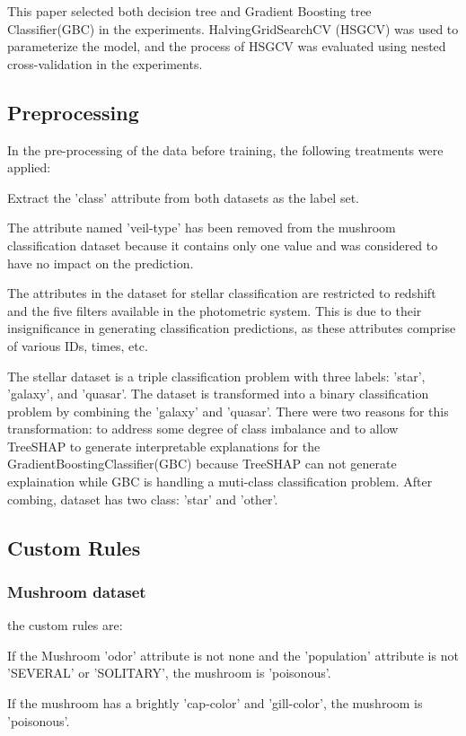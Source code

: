 \documentclass[runningheads,a4paper]{llncs}
\begin{document}
This paper selected both decision tree and Gradient Boosting tree Classifier(GBC) in the experiments. HalvingGridSearchCV (HSGCV)\cite{pmlr-v51-jamieson16} was used to parameterize the model, and the process of HSGCV was evaluated using nested cross-validation\cite{https://doi.org/10.1111/j.2517-6161.1974.tb00994.x} in the experiments.

\subsection{Preprocessing}
In the pre-processing of the data before training, the following treatments were applied:

Extract the 'class' attribute from both datasets as the label set.

The attribute named 'veil-type' has been removed from the mushroom  classification dataset because it contains only one value and was considered to have no impact on the prediction.

The attributes in the dataset for stellar classification are restricted to redshift and the five filters available in the photometric system. This is due to their insignificance in generating classification predictions, as these attributes comprise of various IDs, times, etc.

The stellar dataset is a triple classification problem with three labels: 'star', 'galaxy', and 'quasar'. 
The dataset is transformed into a binary classification problem by combining the 'galaxy' and 'quasar'. 
There were two reasons for this transformation: to address some degree of class imbalance and to allow TreeSHAP to generate interpretable explanations for the GradientBoostingClassifier(GBC) because TreeSHAP can not generate explaination while GBC is  handling a muti-class classification problem.
After combing, dataset has two class: 'star' and 'other'.
\subsection{Custom Rules}
\subsubsection{Mushroom dataset} 

the custom rules are:

If the Mushroom 'odor' attribute is not none and the 'population' attribute is not 'SEVERAL' or 'SOLITARY', the mushroom is 'poisonous'.

If the mushroom has a brightly 'cap-color' and 'gill-color', the mushroom is 'poisonous'.
\end{document}
